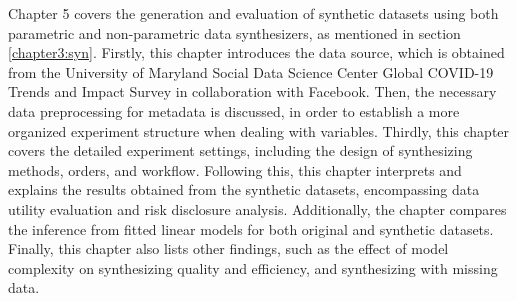 Chapter 5 covers the generation and evaluation of synthetic datasets using both parametric and non-parametric data synthesizers, as mentioned in section \ref{chapter3:syn}. Firstly, this chapter introduces the data source, which is obtained from the University of Maryland Social Data Science Center Global COVID-19 Trends and Impact Survey in collaboration with Facebook. Then, the necessary data preprocessing for metadata is discussed, in order to establish a more organized experiment structure when dealing with variables. Thirdly, this chapter covers the detailed experiment settings, including the design of synthesizing methods, orders, and workflow. Following this, this chapter interprets and explains the results obtained from the synthetic datasets, encompassing data utility evaluation and risk disclosure analysis. Additionally, the chapter compares the inference from fitted linear models for both original and synthetic datasets. Finally, this chapter also lists other findings, such as the effect of model complexity on synthesizing quality and efficiency, and synthesizing with missing data.

